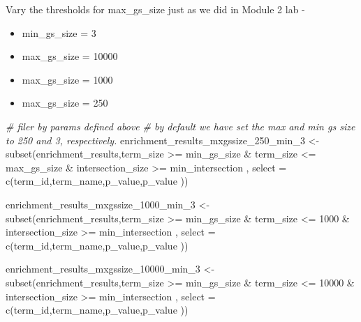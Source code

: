 \documentclass[
]{book}
\newenvironment{Shaded}{\begin{snugshade}}{\end{snugshade}}
\newcommand{\AttributeTok}[1]{\textcolor[rgb]{0.77,0.63,0.00}{#1}}
\newcommand{\CommentTok}[1]{\textcolor[rgb]{0.56,0.35,0.01}{\textit{#1}}}
\newcommand{\DecValTok}[1]{\textcolor[rgb]{0.00,0.00,0.81}{#1}}
\newcommand{\FunctionTok}[1]{\textcolor[rgb]{0.00,0.00,0.00}{#1}}
\newcommand{\NormalTok}[1]{#1}
\newcommand{\OtherTok}[1]{\textcolor[rgb]{0.56,0.35,0.01}{#1}}
\newcommand{\SpecialCharTok}[1]{\textcolor[rgb]{0.00,0.00,0.00}{#1}}
\begin{document}
Vary the thresholds for max\_gs\_size just as we did in Module 2 lab -

\begin{itemize}
\item
  min\_gs\_size = 3
\item
  max\_gs\_size = 10000
\item
  max\_gs\_size = 1000
\item
  max\_gs\_size = 250
\end{itemize}

\begin{Shaded}
\begin{Highlighting}[]
\CommentTok{\# filer by params defined above}
\CommentTok{\# by default we have set the max and min gs size to 250 and 3, respectively.}
\NormalTok{enrichment\_results\_mxgssize\_250\_min\_3 }\OtherTok{\textless{}{-}} 
                        \FunctionTok{subset}\NormalTok{(enrichment\_results,term\_size }\SpecialCharTok{\textgreater{}=}\NormalTok{ min\_gs\_size }\SpecialCharTok{\&} 
\NormalTok{                                   term\_size }\SpecialCharTok{\textless{}=}\NormalTok{ max\_gs\_size }\SpecialCharTok{\&} 
\NormalTok{                                   intersection\_size }\SpecialCharTok{\textgreater{}=}\NormalTok{ min\_intersection , }
                                 \AttributeTok{select =} \FunctionTok{c}\NormalTok{(term\_id,term\_name,p\_value,p\_value ))}

\NormalTok{enrichment\_results\_mxgssize\_1000\_min\_3 }\OtherTok{\textless{}{-}} 
                        \FunctionTok{subset}\NormalTok{(enrichment\_results,term\_size }\SpecialCharTok{\textgreater{}=}\NormalTok{ min\_gs\_size }\SpecialCharTok{\&} 
\NormalTok{                                   term\_size }\SpecialCharTok{\textless{}=} \DecValTok{1000} \SpecialCharTok{\&} 
\NormalTok{                                   intersection\_size }\SpecialCharTok{\textgreater{}=}\NormalTok{ min\_intersection , }
                                 \AttributeTok{select =} \FunctionTok{c}\NormalTok{(term\_id,term\_name,p\_value,p\_value ))}

\NormalTok{enrichment\_results\_mxgssize\_10000\_min\_3 }\OtherTok{\textless{}{-}} 
                        \FunctionTok{subset}\NormalTok{(enrichment\_results,term\_size }\SpecialCharTok{\textgreater{}=}\NormalTok{ min\_gs\_size }\SpecialCharTok{\&} 
\NormalTok{                                   term\_size }\SpecialCharTok{\textless{}=} \DecValTok{10000} \SpecialCharTok{\&} 
\NormalTok{                                   intersection\_size }\SpecialCharTok{\textgreater{}=}\NormalTok{ min\_intersection , }
                                 \AttributeTok{select =} \FunctionTok{c}\NormalTok{(term\_id,term\_name,p\_value,p\_value ))}
\end{Highlighting}
\end{Shaded}
\end{document}
